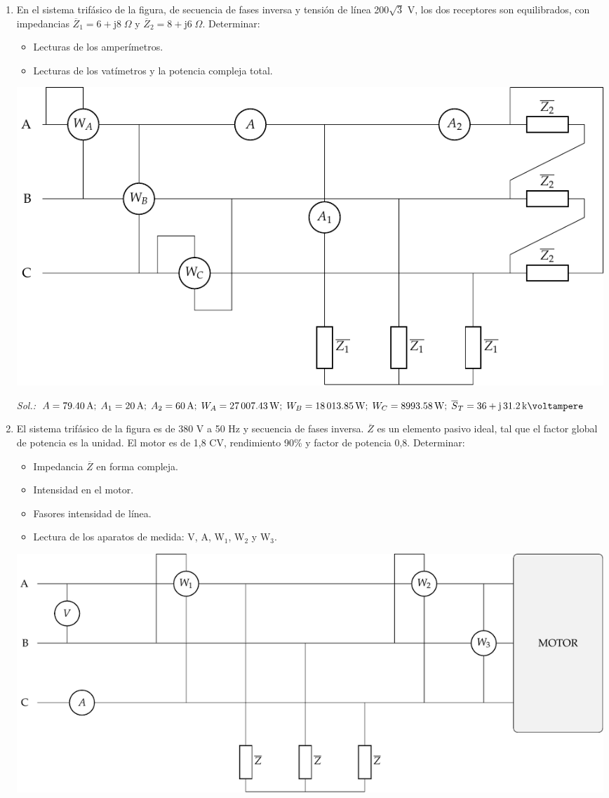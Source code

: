 \begin{enumerate}
\item En el sistema trifásico de la figura, de secuencia de fases
  inversa y tensión de línea 200$\sqrt{3}$ V, los dos receptores son
  equilibrados, con impedancias
  $\overline{Z}_1 = 6+\mathrm{j}8\;\Omega$ y
  $\overline{Z}_2 = 8+\mathrm{j}6\;\Omega$. Determinar:
  \begin{itemize}
  \item Lecturas de los amperímetros.
  \item Lecturas de los vatímetros y la potencia compleja total.
  \end{itemize}
  \begin{center}
    \includegraphics[width=.93\linewidth]{../figs/ej5_BT3.pdf}
  \end{center}

  \emph{Sol.:\;
    $A=\qty{79.40}{\ampere};\;
    A_1=\qty{20}{\ampere};\;
    A_2=\qty{60}{\ampere};\; 
    W_A=\qty{27007.43}{\watt};\;
    W_B=\qty{18013.85}{\watt};\;
    W_C=\qty{8993.58}{\watt};\;
    \overline{S}_T=36+\mathrm{j}\,31.2\,\si{\kilo\voltampere} $}

\item El sistema trifásico de la figura es de 380 V a 50 Hz y
  secuencia de fases inversa. $\overline{Z}$ es un elemento pasivo
  ideal, tal que el factor global de potencia es la unidad. El motor
  es de 1,8 CV, rendimiento 90\% y factor de potencia 0,8. Determinar:
  \begin{itemize}
  \item Impedancia $\overline{Z}$ en forma compleja.
  \item Intensidad en el motor.
  \item Fasores intensidad de línea.
  \item Lectura de los aparatos de medida: V, A, W$_1$, W$_2$ y W$_3$.
  \end{itemize}
  \begin{center}
    \includegraphics[width=\linewidth]{../figs/ej7_BT3.pdf}
  \end{center}


\end{enumerate}
